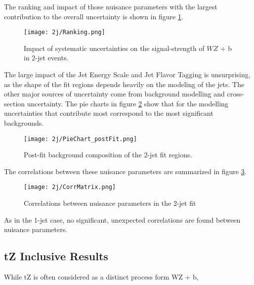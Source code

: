 The ranking and impact of those nuisance parameters with the largest contribution to the overall uncertainty is shown in figure \ref{fig:ranking_2j}.

\begin{figure}[H]
    \centering
    \texttt{[image: 2j/Ranking.png]}
    \caption{Impact of systematic uncertainties on the signal-strength of $WZ$ + b in 2-jet events.}
    \label{fig:ranking_2j}
\end{figure}

The large impact of the Jet Energy Scale and Jet Flavor Tagging is unsurprising, as the shape of the fit regions depends heavily on the modeling of the jets. The other major sources of uncertainty come from background modelling and cross-section uncertainty. The pie charts in figure \ref{fig:pie_chart_2j} show that for the modelling uncertainties that contribute most correspond to the most significant backgrounds. %

\begin{figure}[H]
    \centering
    \texttt{[image: 2j/PieChart\_postFit.png]}
    \caption{Post-fit background composition of the 2-jet fit regions.}
    \label{fig:pie_chart_2j}
\end{figure}

The correlations between these nuisance parameters are summarized in figure \ref{fig:corr_mat_2j}. 

\begin{figure}[H]
    \centering
    \texttt{[image: 2j/CorrMatrix.png]}
    \caption{Correlations between nuisance parameters in the 2-jet fit}
    \label{fig:corr_mat_2j}
\end{figure}

As in the 1-jet case, no significant, unexpected correlations are found between nuisance parameters.

\subsection{tZ Inclusive Results}

While tZ is often considered as a distinct process form WZ + b,  

